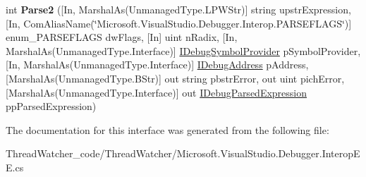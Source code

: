 \begin{DoxyCompactItemize}
\item 
\hypertarget{interface_microsoft_1_1_visual_studio_1_1_debugger_1_1_interop_e_e_1_1_i_debug_expression_evaluator3_a28d26f7243ad4bf6244189f127a6d126}{int {\bfseries Parse2} (\mbox{[}In, Marshal\+As(Unmanaged\+Type.\+L\+P\+W\+Str)\mbox{]} string upstr\+Expression, \mbox{[}In, Com\+Alias\+Name(\char`\"{}Microsoft.\+Visual\+Studio.\+Debugger.\+Interop.\+P\+A\+R\+S\+E\+F\+L\+A\+G\+S\char`\"{})\mbox{]} enum\+\_\+\+P\+A\+R\+S\+E\+F\+L\+A\+G\+S dw\+Flags, \mbox{[}In\mbox{]} uint n\+Radix, \mbox{[}In, Marshal\+As(Unmanaged\+Type.\+Interface)\mbox{]} \hyperlink{interface_microsoft_1_1_visual_studio_1_1_debugger_1_1_interop_e_e_1_1_i_debug_symbol_provider}{I\+Debug\+Symbol\+Provider} p\+Symbol\+Provider, \mbox{[}In, Marshal\+As(Unmanaged\+Type.\+Interface)\mbox{]} \hyperlink{interface_microsoft_1_1_visual_studio_1_1_debugger_1_1_interop_e_e_1_1_i_debug_address}{I\+Debug\+Address} p\+Address, \mbox{[}Marshal\+As(Unmanaged\+Type.\+B\+Str)\mbox{]} out string pbstr\+Error, out uint pich\+Error, \mbox{[}Marshal\+As(Unmanaged\+Type.\+Interface)\mbox{]} out \hyperlink{interface_microsoft_1_1_visual_studio_1_1_debugger_1_1_interop_e_e_1_1_i_debug_parsed_expression}{I\+Debug\+Parsed\+Expression} pp\+Parsed\+Expression)}\label{interface_microsoft_1_1_visual_studio_1_1_debugger_1_1_interop_e_e_1_1_i_debug_expression_evaluator3_a28d26f7243ad4bf6244189f127a6d126}

\end{DoxyCompactItemize}


The documentation for this interface was generated from the following file\+:\begin{DoxyCompactItemize}
\item 
Thread\+Watcher\+\_\+code/\+Thread\+Watcher/Microsoft.\+Visual\+Studio.\+Debugger.\+Interop\+E\+E.\+cs\end{DoxyCompactItemize}
